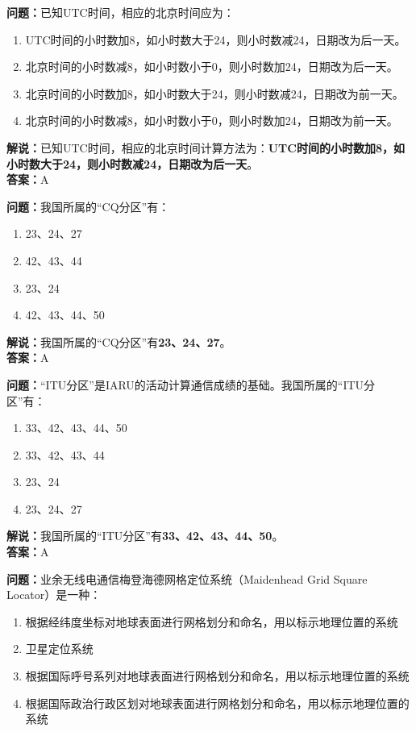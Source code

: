 \textbf{问题：}已知UTC时间，相应的北京时间应为：

\begin{enumerate}[label=\Alph*), leftmargin=1.5cm]
	\item UTC时间的小时数加8，如小时数大于24，则小时数减24，日期改为后一天。
	\item 北京时间的小时数减8，如小时数小于0，则小时数加24，日期改为后一天。
	\item 北京时间的小时数加8，如小时数大于24，则小时数减24，日期改为前一天。
	\item 北京时间的小时数减8，如小时数小于0，则小时数加24，日期改为前一天。
\end{enumerate}

\textbf{解说：}已知UTC时间，相应的北京时间计算方法为：\textbf{UTC时间的小时数加8，如小时数大于24，则小时数减24，日期改为后一天}。\\\textbf{答案：}A



\textbf{问题：}我国所属的“CQ分区”有：

\begin{enumerate}[label=\Alph*), leftmargin=1.5cm]
	\item 23、24、27
	\item 42、43、44
	\item 23、24
	\item 42、43、44、50
\end{enumerate}

\textbf{解说：}我国所属的“CQ分区”有\textbf{23、24、27}。\\\textbf{答案：}A



\textbf{问题：}“ITU分区”是IARU的活动计算通信成绩的基础。我国所属的“ITU分区”有：

\begin{enumerate}[label=\Alph*), leftmargin=1.5cm]
	\item 33、42、43、44、50
	\item 33、42、43、44
	\item 23、24
	\item 23、24、27
\end{enumerate}

\textbf{解说：}我国所属的“ITU分区”有\textbf{33、42、43、44、50}。\\\textbf{答案：}A



\textbf{问题：}业余无线电通信梅登海德网格定位系统（Maidenhead Grid Square Locator）是一种：

\begin{enumerate}[label=\Alph*), leftmargin=1.5cm]
	\item 根据经纬度坐标对地球表面进行网格划分和命名，用以标示地理位置的系统
	\item 卫星定位系统
	\item 根据国际呼号系列对地球表面进行网格划分和命名，用以标示地理位置的系统
	\item 根据国际政治行政区划对地球表面进行网格划分和命名，用以标示地理位置的系统
\end{enumerate}

